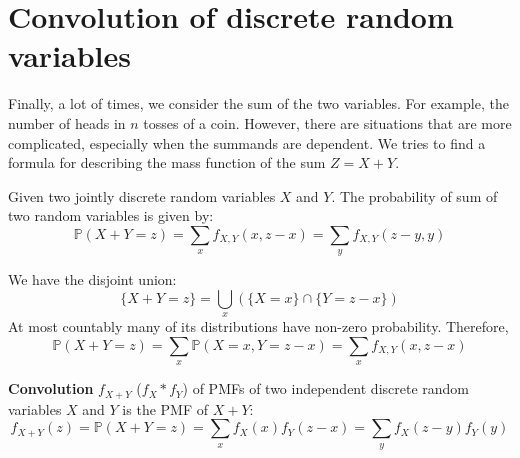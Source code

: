 \documentclass{huhtakm-template-book}
\newcommand{\prob}{\mathbb{P}}
\begin{document}
\section{Convolution of discrete random variables}
Finally, a lot of times, we consider the sum of the two variables. For example, the number of heads in $n$ tosses of a coin. However, there are situations that are more complicated, especially when the summands are dependent. We tries to find a formula for describing the mass function of the sum $Z=X+Y$.
\begin{thm}
	Given two jointly discrete random variables $X$ and $Y$. The probability of sum of two random variables is given by:
	\begin{equation*}
		\prob(X+Y=z)=\sum_{x}f_{X,Y}(x,z-x)=\sum_{y}f_{X,Y}(z-y,y)
	\end{equation*}
\end{thm}
\begin{proofing}
	We have the disjoint union:
	\begin{equation*}
		\{X+Y=z\}=\bigcup_{x}(\{X=x\}\cap\{Y=z-x\})
	\end{equation*}
	At most countably many of its distributions have non-zero probability. Therefore,
	\begin{equation*}
		\prob(X+Y=z)=\sum_{x}\prob(X=x,Y=z-x)=\sum_{x}f_{X,Y}(x,z-x)
	\end{equation*}
\end{proofing}
\begin{defn}
	\textbf{Convolution} $f_{X+Y}$ ($f_{X}*f_{Y}$) of PMFs of two independent discrete random variables $X$ and $Y$ is the PMF of $X+Y$:
	\begin{equation*}
		f_{X+Y}(z)=\prob(X+Y=z)=\sum_{x}f_{X}(x)f_{Y}(z-x)=\sum_{y}f_{X}(z-y)f_{Y}(y)
	\end{equation*}
\end{defn}
\end{document}
